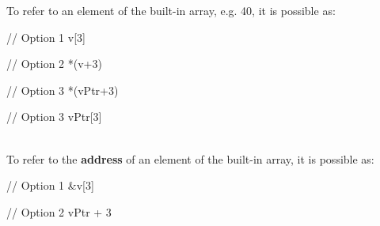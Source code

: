 \noindent To refer to an element of the built-in array, e.g. 40, it is possible as:\\
\begin{minipage}{\MPWxXXXXSxLISTING\textwidth} %
    \begin{CPPCode}
// Option 1
v[3]
    \end{CPPCode}
    \end{minipage}
\begin{minipage}{\MPWxXXXXSxLISTING\textwidth} %
    \begin{CPPCode}
// Option 2
*(v+3)
    \end{CPPCode}
    \end{minipage}
\begin{minipage}{\MPWxXXXXSxLISTING\textwidth} %
    \begin{CPPCode}
// Option 3
*(vPtr+3)
    \end{CPPCode}
    \end{minipage}
\begin{minipage}{\MPWxXXXXSxLISTING\textwidth} %
    \begin{CPPCode}
// Option 3
vPtr[3]
    \end{CPPCode}
    \end{minipage}\\

\noindent To refer to the \textbf{address} of an element of the built-in array, it is possible as:\\
\begin{minipage}{\MPWxXXXSxLISTING\textwidth} %
    \begin{CPPCode}
// Option 1
&v[3]
    \end{CPPCode}
    \end{minipage}
\begin{minipage}{\MPWxXXXSxLISTING\textwidth} %
    \begin{CPPCode}
// Option 2
vPtr + 3
    \end{CPPCode}
    \end{minipage}\\

